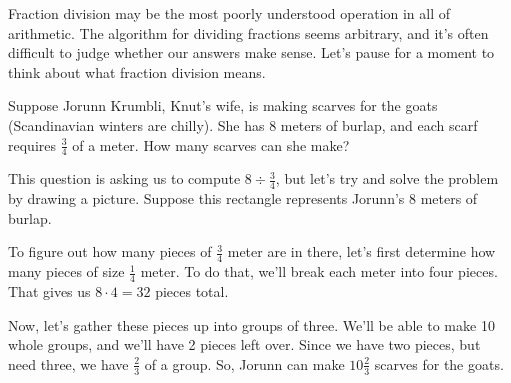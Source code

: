 Fraction division may be the most poorly understood operation in all of arithmetic. The algorithm for dividing fractions seems arbitrary, and it's often difficult to judge whether our answers make sense. Let's pause for a moment to think about what fraction division means.

Suppose Jorunn Krumbli, Knut's wife, is making scarves for the goats (Scandinavian winters are chilly). She has 8 meters of burlap, and each scarf requires $\frac{3}{4}$ of a meter. How many scarves can she make?

This question is asking us to compute $8 \div \frac{3}{4}$, but let's try and solve the problem by drawing a picture. Suppose this rectangle represents Jorunn's 8 meters of burlap.
\begin{center}
\end{center}

To figure out how many pieces of $\frac{3}{4}$ meter are in there, let's first determine how many pieces of size $\frac{1}{4}$ meter. To do that, we'll break each meter into four pieces. That gives us $8 \cdot 4 = 32$ pieces total.
\begin{center}
\end{center}

Now, let's gather these pieces up into groups of three. We'll be able to make 10 whole groups, and we'll have 2 pieces left over. Since we have two pieces, but need three, we have $\frac{2}{3}$ of a group. So, Jorunn can make $10\frac{2}{3}$ scarves for the goats.
\begin{center}
\end{center}

